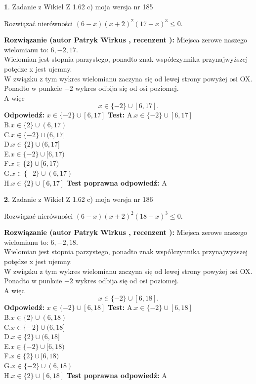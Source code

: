 \documentclass[12pt, a4paper]{article}
\theoremstyle{definition} %
\newtheorem{zad}{}
\newcommand{\zadStart}[1]{\begin{zad}#1\newline}
\newcommand{\zadStop}{\end{zad}}
\newcommand{\rozwStart}[2]{\noindent \textbf{Rozwiązanie (autor #1 , recenzent #2): }\newline}
\newcommand{\rozwStop}{\newline}
\newcommand{\odpStart}{\noindent \textbf{Odpowiedź:}\newline}
\newcommand{\odpStop}{\newline}
\newcommand{\testStart}{\noindent \textbf{Test:}\newline}
\newcommand{\testStop}{\newline}
\newcommand{\kluczStart}{\noindent \textbf{Test poprawna odpowiedź:}\newline}
\newcommand{\kluczStop}{\newline}
\begin{document}
\zadStart{Zadanie z Wikieł Z 1.62 c) moja wersja nr 185}

Rozwiązać nierówności $(6-x)(x+2)^{2}(17-x)^{3}\le0$.
\zadStop
\rozwStart{Patryk Wirkus}{}
Miejsca zerowe naszego wielomianu to: $6, -2, 17$.\\
Wielomian jest stopnia parzystego, ponadto znak współczynnika przy\linebreak najwyższej potędze x jest ujemny.\\ W związku z tym wykres wielomianu zaczyna się od lewej strony powyżej osi OX.\\
Ponadto w punkcie $-2$ wykres odbija się od osi poziomej.\\
A więc $$x \in \{-2\} \cup [6,17].$$
\rozwStop
\odpStart
$x \in \{-2\} \cup [6,17]$
\odpStop
\testStart
A.$x \in \{-2\} \cup [6,17]$\\
B.$x \in \{2\} \cup (6,17)$\\
C.$x \in \{-2\} \cup (6,17]$\\
D.$x \in \{2\} \cup (6,17]$\\
E.$x \in \{-2\} \cup [6,17)$\\
F.$x \in \{2\} \cup [6,17)$\\
G.$x \in \{-2\} \cup (6,17)$\\
H.$x \in \{2\} \cup [6,17]$
\testStop
\kluczStart
A
\kluczStop



\zadStart{Zadanie z Wikieł Z 1.62 c) moja wersja nr 186}

Rozwiązać nierówności $(6-x)(x+2)^{2}(18-x)^{3}\le0$.
\zadStop
\rozwStart{Patryk Wirkus}{}
Miejsca zerowe naszego wielomianu to: $6, -2, 18$.\\
Wielomian jest stopnia parzystego, ponadto znak współczynnika przy\linebreak najwyższej potędze x jest ujemny.\\ W związku z tym wykres wielomianu zaczyna się od lewej strony powyżej osi OX.\\
Ponadto w punkcie $-2$ wykres odbija się od osi poziomej.\\
A więc $$x \in \{-2\} \cup [6,18].$$
\rozwStop
\odpStart
$x \in \{-2\} \cup [6,18]$
\odpStop
\testStart
A.$x \in \{-2\} \cup [6,18]$\\
B.$x \in \{2\} \cup (6,18)$\\
C.$x \in \{-2\} \cup (6,18]$\\
D.$x \in \{2\} \cup (6,18]$\\
E.$x \in \{-2\} \cup [6,18)$\\
F.$x \in \{2\} \cup [6,18)$\\
G.$x \in \{-2\} \cup (6,18)$\\
H.$x \in \{2\} \cup [6,18]$
\testStop
\kluczStart
A
\kluczStop
\end{document}
